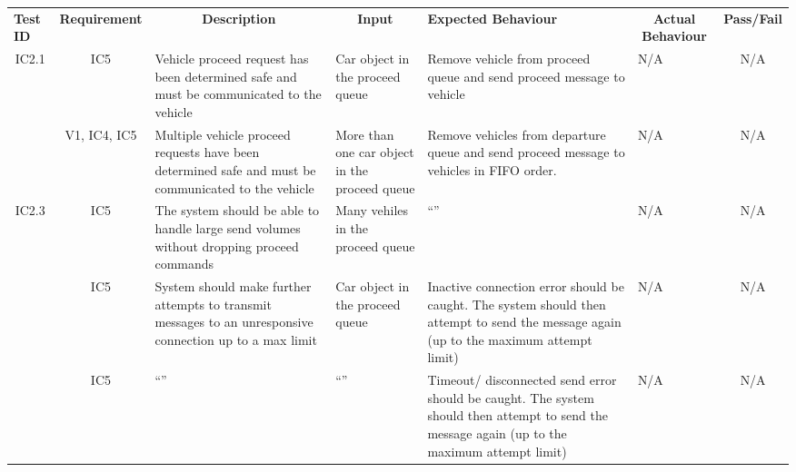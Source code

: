 \documentclass [10pt]{article}
\begin{document}
    
 \begin{longtable}{ | p{ } | p{ } |  p{ } |  p{ } | p{ } | p{ } |  p{ } |}  \hline

    \rowcolor{subsectionC}\textbf{Test ID}
    & \multicolumn{1}{c|}{\textbf{Requirement} }
    &\multicolumn{1}{c|}{\textbf{Description} }
    & \multicolumn{1}{c|}{\textbf{Input} }
    & \textbf{Expected Behaviour} 
    & \multicolumn{1}{c|}{\textbf{Actual Behaviour} }
    & \multicolumn{1}{c|}{\textbf{Pass/Fail}} \\  
    
   
    \multicolumn{1}{|c|}{IC2.1} 
    & \multicolumn{1}{c|}{IC5}
    & Vehicle proceed request has been determined safe and must be communicated to the vehicle
    & Car object in the proceed queue
    & Remove vehicle from proceed queue and send proceed message to vehicle 
    & N/A
    & \multicolumn{1}{|c|}{N/A}\\ 
    
  
    \rowcolor{tableCell}\multicolumn{1}{|c|}{IC2.2} 
    & \multicolumn{1}{c|}{V1, IC4, IC5}
    & Multiple vehicle proceed requests have been determined safe and must be communicated to the vehicle
    & More than one car object in the proceed queue
    & Remove vehicles from departure queue and send proceed message to vehicles in FIFO order.  
    & N/A
    & \multicolumn{1}{|c|}{N/A}\\ 
    
    
    \multicolumn{1}{|c|}{IC2.3} 
    & \multicolumn{1}{c|}{IC5}
    & The system should be able to handle large send volumes without dropping proceed commands
    & Many vehiles in the proceed queue
    & ``''
    & N/A
    & \multicolumn{1}{|c|}{N/A}\\ \hline
    
    
   
    \rowcolor{tableCell}\multicolumn{1}{|c|}{IC2.4} 
    & \multicolumn{1}{c|}{IC5}
    & System should make further attempts to transmit messages to an unresponsive connection  up to a max limit 
    & Car object in the proceed queue
    & Inactive connection error should be caught. The system should then attempt to send the message again (up to the maximum attempt limit)
    & N/A
    & \multicolumn{1}{|c|}{N/A}\\  \hline
    
    \pagebreak \hline
   
    
    \multicolumn{1}{|c|}{IC2.5} 
    & \multicolumn{1}{c|}{IC5}
    & ``''
    & ``'' 
    &  Timeout/ disconnected send error should be caught.  The system should then attempt to send the message again (up to the maximum attempt limit)
    & N/A
    & \multicolumn{1}{|c|}{N/A}\\ \hline
    
    \end{longtable}
    
\end{document}
